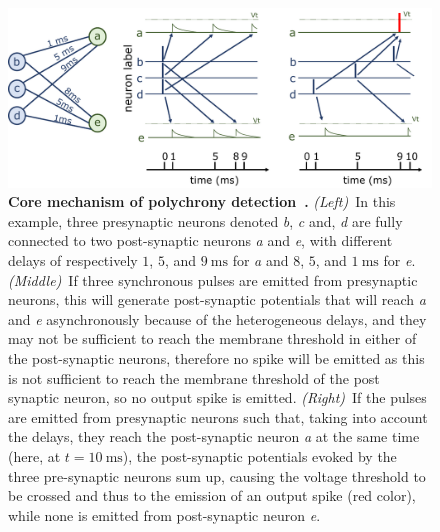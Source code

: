 \documentclass[brainsci, %
               review,submit,pdftex,moreauthors
               ]{Definitions/mdpi}
\newcommand{\ms}{\si{\milli\second}}%
\begin{document}
\begin{figure}%
  \centering
  \includegraphics[width=0.980\linewidth]{figures/izhikevich.pdf}%
    \caption{\textbf{Core mechanism of polychrony detection~\citep{izhikevich_polychronization_2006}.} \textit{(Left)}~In this example, three presynaptic neurons denoted \textit{b}, \textit{c} and, \textit{d} are fully connected to two post-synaptic neurons \textit{a} and \textit{e}, with different delays of respectively $1$, $5$, and $9~\ms$ for \textit{a} and  $8$, $5$, and $1~\ms$ for \textit{e}. \textit{(Middle)}~If three synchronous pulses are emitted from presynaptic neurons, this will generate post-synaptic potentials that will reach \textit{a} and \textit{e} asynchronously because of the heterogeneous delays, and they may not be sufficient to reach the membrane threshold in either of the post-synaptic neurons, therefore no spike will be emitted as this is not sufficient to reach the membrane threshold of the post synaptic neuron, so no output spike is emitted.
    \textit{(Right)}~If the pulses are emitted from presynaptic neurons such that, taking into account the delays, they reach the post-synaptic neuron \textit{a} at the same time (here, at $t=10~\ms$),  the post-synaptic potentials evoked by the three pre-synaptic neurons sum up, causing the voltage threshold to be crossed and thus to the emission of an output spike (red color), while none is emitted from post-synaptic neuron \textit{e}.
     }
  \label{fig:izhikevich}
\end{figure}
% 
\end{document}
